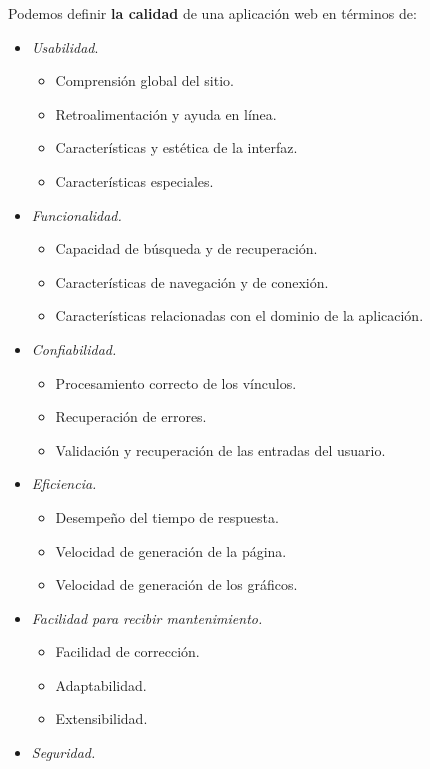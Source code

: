 		\bigskip
		\bigskip
		Podemos definir \textbf{la calidad} de una aplicación web en términos de:
		\begin{itemize}
			\item \textit{Usabilidad}.
				\begin{itemize}
					\item Comprensión global del sitio.
					\item Retroalimentación y ayuda en línea.
					\item Características y estética de la interfaz.
					\item Características especiales.
				\end{itemize}
			\item \textit{Funcionalidad.}
				\begin{itemize}
					\item Capacidad de búsqueda y de recuperación.
					\item Características de navegación y de conexión.
					\item Características relacionadas con el dominio de la aplicación.
				\end{itemize}
			\item \textit{Confiabilidad.}
				\begin{itemize}
					\item Procesamiento correcto de los vínculos.
					\item Recuperación de errores.
					\item Validación y recuperación de las entradas del usuario.
				\end{itemize}
			\item \textit{Eficiencia.}
				\begin{itemize}
					\item Desempeño del tiempo de respuesta.
					\item Velocidad de generación de la página.
					\item Velocidad de generación de los gráficos.
				\end{itemize}
			\item \textit{Facilidad para recibir mantenimiento.}
				\begin{itemize}
					\item Facilidad de corrección.
					\item Adaptabilidad.
					\item Extensibilidad.
				\end{itemize}
			\item \textit{Seguridad.}
				\begin{itemize}

\end{itemize}
\end{itemize}
